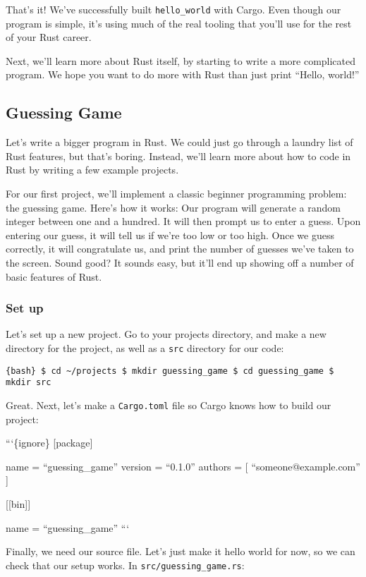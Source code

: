 \documentclass[]{article}
\begin{document}
That's it! We've successfully built \texttt{hello\_world} with Cargo.
Even though our program is simple, it's using much of the real tooling
that you'll use for the rest of your Rust career.

Next, we'll learn more about Rust itself, by starting to write a more
complicated program. We hope you want to do more with Rust than just
print ``Hello, world!''

\subsection{Guessing Game}\label{guessing-game}

Let's write a bigger program in Rust. We could just go through a laundry
list of Rust features, but that's boring. Instead, we'll learn more
about how to code in Rust by writing a few example projects.

For our first project, we'll implement a classic beginner programming
problem: the guessing game. Here's how it works: Our program will
generate a random integer between one and a hundred. It will then prompt
us to enter a guess. Upon entering our guess, it will tell us if we're
too low or too high. Once we guess correctly, it will congratulate us,
and print the number of guesses we've taken to the screen. Sound good?
It sounds easy, but it'll end up showing off a number of basic features
of Rust.

\subsubsection{Set up}\label{set-up}

Let's set up a new project. Go to your projects directory, and make a
new directory for the project, as well as a \texttt{src} directory for
our code:

\texttt{\{bash\} \$ cd \textasciitilde{}/projects \$ mkdir guessing\_game \$ cd guessing\_game \$ mkdir src}

Great. Next, let's make a \texttt{Cargo.toml} file so Cargo knows how to
build our project:

```\{ignore\} {[}package{]}

name = ``guessing\_game'' version = ``0.1.0'' authors = {[}
``someone@example.com'' {]}

{[}{[}bin{]}{]}

name = ``guessing\_game'' ```

Finally, we need our source file. Let's just make it hello world for
now, so we can check that our setup works. In
\texttt{src/guessing\_game.rs}:
\end{document}

